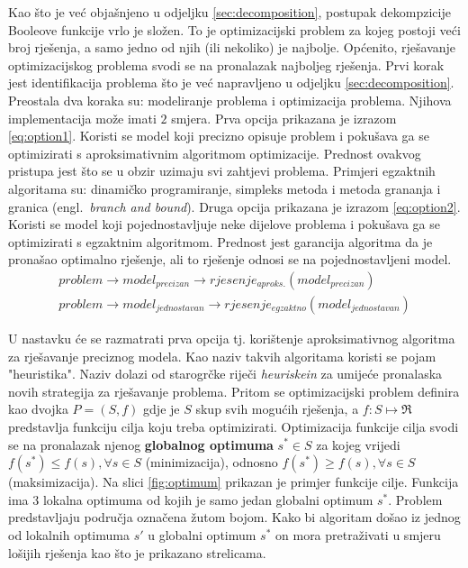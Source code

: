 \documentclass[times, utf8, diplomski]{fer}
\begin{document}
Kao što je već objašnjeno u odjeljku \ref{sec:decomposition}, postupak dekompzicije Booleove funkcije vrlo je složen. To je optimizacijski problem za kojeg postoji veći broj rješenja, a samo jedno od njih (ili nekoliko) je najbolje. Općenito, rješavanje optimizacijskog problema svodi se na pronalazak najboljeg rješenja. Prvi korak jest identifikacija problema što je već napravljeno u odjeljku \ref{sec:decomposition}. Preostala dva koraka su: modeliranje problema i optimizacija problema. Njihova implementacija može imati $2$ smjera. Prva opcija prikazana je izrazom \ref{eq:option1}. Koristi se model koji precizno opisuje problem i pokušava ga se optimizirati s aproksimativnim algoritmom optimizacije. Prednost ovakvog pristupa jest što se u obzir uzimaju svi zahtjevi problema. Primjeri egzaktnih algoritama su: dinamičko programiranje, simpleks metoda i metoda grananja i granica (engl.~\textit{branch and bound}). Druga opcija prikazana je izrazom \ref{eq:option2}. Koristi se model koji pojednostavljuje neke dijelove problema i pokušava ga se optimizirati s egzaktnim algoritmom. Prednost jest garancija algoritma da je pronašao optimalno rješenje, ali to rješenje odnosi se na pojednostavljeni model.
%
\begin{gather}
	\label{eq:option1}
	problem \rightarrow model_{precizan} \rightarrow rjesenje_{aproks.}(model_{precizan}) \\
	\label{eq:option2}
	problem \rightarrow model_{jednostavan} \rightarrow rjesenje_{egzaktno}(model_{jednostavan})
\end{gather}

U nastavku će se razmatrati prva opcija tj. korištenje aproksimativnog algoritma za rješavanje preciznog modela. Kao naziv takvih algoritama koristi se pojam "heuristika". Naziv dolazi od starogrčke riječi \textit{heuriskein} za umijeće pronalaska novih strategija za rješavanje problema. Pritom se optimizacijski problem definira kao dvojka $P=(S,f)$ gdje je $S$ skup svih mogućih rješenja, a $f:S \mapsto \Re$ predstavlja funkciju cilja koju treba optimizirati. Optimizacija funkcije cilja svodi se na pronalazak njenog \textbf{globalnog optimuma} $s^{*} \in S$ za kojeg vrijedi $f(s^{*}) \leq f(s), \forall s \in S$ (minimizacija), odnosno $f(s^{*}) \geq f(s), \forall s \in S$ (maksimizacija). Na slici \ref{fig:optimum} prikazan je primjer funkcije cilje. Funkcija ima $3$ lokalna optimuma od kojih je samo jedan globalni optimum $s^{*}$. Problem predstavljaju područja označena žutom bojom. Kako bi algoritam došao iz jednog od lokalnih optimuma $s'$ u globalni optimum $s^{*}$ on mora pretraživati u smjeru lošijih rješenja kao što je prikazano strelicama.
\end{document}
